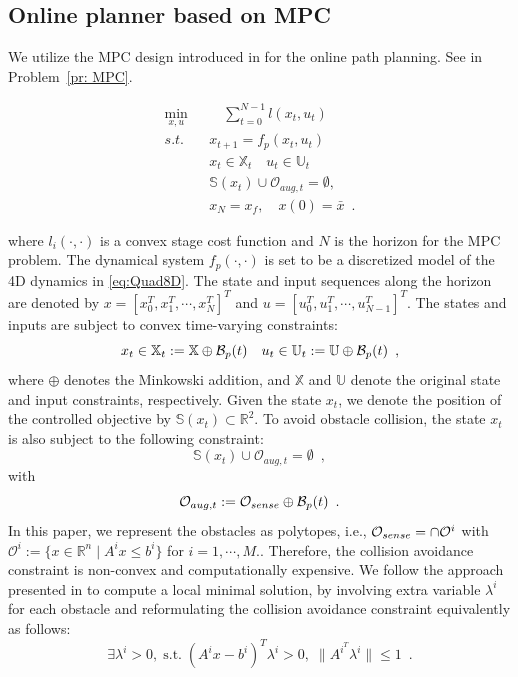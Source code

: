 \subsection{Online planner based on MPC}
%
We utilize the MPC design introduced in \cite{zhang_2017_MPC} for the online path planning. See in Problem~\ref{pr: MPC}.
%
\begin{problem}\label{pr: MPC}
\begin{align*}
\min_{x,u}  & \quad \sum^{N-1}_{t=0} l(x_t,u_t)  \\
s.t. \quad &x_{t+1} = f_p(x_t,u_t)\\
& x_t \in \mathbb{X}_t\quad u_t \in \mathbb{U}_t\\
& \mathbb{S}(x_t)\cup\mathcal{O}_{aug,t} = \emptyset,\\
& x_N = x_f ,\quad x(0) = \bar{x} \enspace.
\end{align*}
\end{problem}
\noindent where $l_i(\cdot,\cdot)$ is a  convex stage cost function and $N$ is the horizon for the MPC problem. The dynamical system $f_p(\cdot,\cdot)$ is set to be a discretized model of the 4D dynamics in \ref{eq:Quad8D}. The state and input sequences along the horizon  are denoted by $x=[x^{T}_0,x^{T}_1,\cdots,x^{T}_N]^{T}$ and $u=[u^{T}_0,u^{T}_1,\cdots,u^{T}_{N-1}]^{T}$. The states and inputs are subject to convex time-varying constraints:
%
\begin{equation}
x_t \in \mathbb{X}_t :=\mathbb{X}\oplus\mathcal B_p(t) \quad u_t \in\mathbb{U}_t := \mathbb{U}\oplus\mathcal B_p(t)  \enspace ,
\end{equation}
%
where $\oplus$ denotes the Minkowski addition, and $\mathbb{X}$ and $\mathbb{U}$ denote the original state and input constraints, respectively. Given the state $x_t$, we denote the position of the controlled objective by $\mathbb{S}(x_t)\subset \mathbb{R}^{2}$. To avoid obstacle collision, the state $x_t$ is also subject to the following constraint: 
%
\begin{equation}
\mathbb{S}(x_t)\cup\mathcal{O}_{aug,t} = \emptyset \enspace ,
\end{equation}
%
with 
%
\begin{equation}
\mathcal{O}_{aug,t} := \mathcal{O}_{sense}\oplus\mathcal B_p(t) \enspace .
\end{equation}
%
In this paper, we represent the obstacles as polytopes, i.e., $\mathcal{O}_{sense} = \cap \mathcal{O}^{i}$ with $\mathcal{O}^{i}:= \{x\in\mathbb{R}^{n} \mid A^{i}x\leq b^{i}\}$ for $i = 1,\cdots ,M.$. Therefore, the collision avoidance constraint is non-convex and computationally expensive. We follow the approach presented in \cite{zhang_2017_MPC} to compute a local minimal solution, by involving extra variable $\lambda^{i}$ for each obstacle and reformulating the collision avoidance constraint equivalently as follows: 
%
\begin{equation}
\exists \lambda^{i} >0, \; \mbox{s.t.} \; (A^{i}x- b^{i})^{T}\lambda^{i}  > 0, \; \|A^{i^{T}}\lambda^{i}\|\leq 1\enspace .
\end{equation}
%
